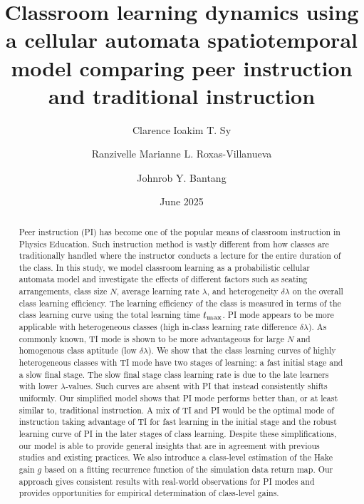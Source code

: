 \documentclass[twocolumn,secnumarabic,amssymb, nobibnotes, aps, prd]{revtex4-2}
\begin{document}
\title{Classroom learning dynamics using a cellular automata spatiotemporal model comparing peer instruction and traditional instruction}%

\author{Clarence Ioakim T. Sy}%
%

\author{Ranzivelle Marianne L. Roxas-Villanueva}%
%

\author{Johnrob Y. Bantang}%
%

\date{June 2025}%

\begin{abstract}
    Peer instruction (PI) has become {one of the popular means} of classroom instruction in Physics Education.
    Such instruction method is vastly different from how classes are traditionally handled where the instructor conducts a lecture for the entire duration of the class.
    In this study, we model classroom learning as a probabilistic cellular automata model 
    and investigate the effects of different factors such as seating arrangements, class size $N$, average learning rate ${\lambda}$, and heterogeneity $\delta{\lambda}$ on the overall class learning efficiency.
    The learning efficiency of the class is measured in terms of the class learning curve {using the total learning time $t_{\rm max}$}.
    PI mode appears to be more applicable with heterogeneous classes (high in-class learning rate difference $\delta{\lambda}$).
    As commonly known, TI mode is shown to be more advantageous for large $N$ and homogenous class aptitude (low $\delta{\lambda}$).
    We show that the class learning curves of highly heterogeneous classes with TI mode have two stages of learning: a fast initial stage and a slow final stage.
    The slow final stage class learning rate is due to the late learners with lower $\lambda$-values.
    Such curves are absent with PI that instead consistently shifts uniformly.
    Our simplified model shows that PI mode {performs better than, or at least similar to,} traditional instruction.
    A mix of TI and PI would be the optimal mode of instruction taking advantage of TI for fast learning in the initial stage and the robust learning curve of PI in the later stages of class learning.
    Despite these simplifications, our model is able to provide general insights that are in agreement with previous studies and existing practices.
    We also introduce a class-level estimation of the Hake gain $g$ based on a fitting recurrence function of the simulation data return map.
    Our approach gives consistent results with real-world observations for PI modes and provides opportunities for empirical determination of class-level gains.
\end{abstract}
\end{document}
